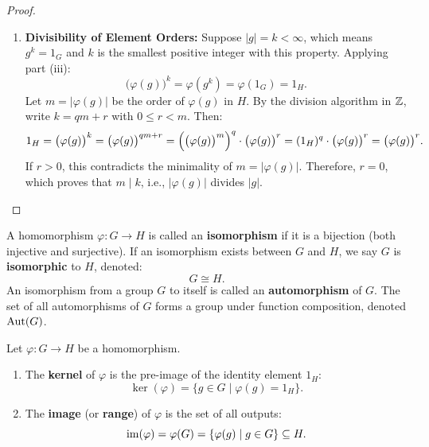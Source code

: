 \begin{proof}
\begin{enumerate}[label=\textbf{(\roman*)}, leftmargin=*, itemsep=8pt]
    \item \textbf{Divisibility of Element Orders:}
    Suppose $|g| = k < \infty$, which means $g^k = 1_G$ and $k$ is the smallest positive integer with this property.
    Applying part (iii):
    \begin{equation*}
    \bigl(\varphi(g)\bigr)^k = \varphi(g^k) = \varphi(1_G) = 1_H.
    \end{equation*}
    Let $m = |\varphi(g)|$ be the order of $\varphi(g)$ in $H$. By the division algorithm in $\mathbb{Z}$, write $k = qm + r$ with $0 \le r < m$.
    Then:
    \begin{equation*}
    1_H = \bigl(\varphi(g)\bigr)^k = \bigl(\varphi(g)\bigr)^{qm+r} = \Bigl(\bigl(\varphi(g)\bigr)^m\Bigr)^q \cdot \bigl(\varphi(g)\bigr)^r = (1_H)^q \cdot \bigl(\varphi(g)\bigr)^r = \bigl(\varphi(g)\bigr)^r.
    \end{equation*}
    If $r > 0$, this contradicts the minimality of $m = |\varphi(g)|$. Therefore, $r = 0$, which proves that $m \mid k$, i.e., $|\varphi(g)|$ divides $|g|$.
\end{enumerate}
\end{proof}

\begin{definition}
A homomorphism $\varphi: G \to H$ is called an \textbf{isomorphism} if it is a bijection (both injective and surjective).
If an isomorphism exists between $G$ and $H$, we say $G$ is \textbf{isomorphic} to $H$, denoted:
\begin{equation}
G \cong H.
\end{equation}
An isomorphism from a group $G$ to itself is called an \textbf{automorphism} of $G$. The set of all automorphisms of $G$ forms a group under function composition, denoted $\operatorname{Aut}(G)$.
\end{definition}

\begin{definition}
Let $\varphi: G \to H$ be a homomorphism.
\begin{enumerate}[label=\textbf{(\arabic*)}, leftmargin=*, itemsep=4pt]
    \item The \textbf{kernel} of $\varphi$ is the pre-image of the identity element $1_H$:
    \begin{equation}
    \ker(\varphi) = \{ g \in G \mid \varphi(g) = 1_H \}.
    \end{equation}
    \item The \textbf{image} (or \textbf{range}) of $\varphi$ is the set of all outputs:
    \begin{equation}
    \operatorname{im}(\varphi) = \varphi(G) = \{ \varphi(g) \mid g \in G \} \subseteq H.
    \end{equation}
\end{enumerate}
\end{definition}

